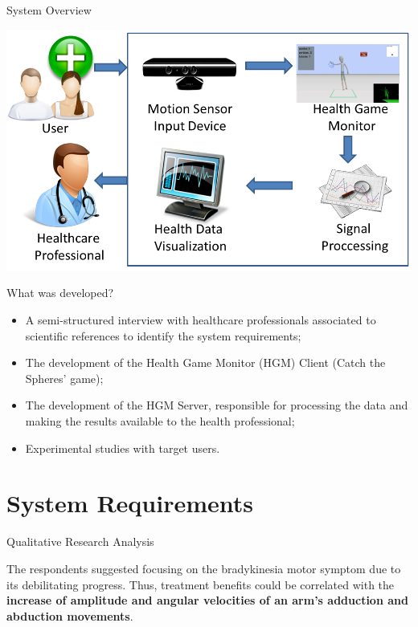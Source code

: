 \documentclass{beamer}
\begin{document}
\begin{frame}{System Overview}
		 \begin{block}{}
			\begin{center}
				\includegraphics[height=2.2 in]{img/systemoverview3.png}
			\end{center}
		 \end{block}
\end{frame}


\begin{frame}{What was developed?}
    \begin{block}{}
        \begin{itemize}[<+->]
            \item  A semi-structured interview with healthcare professionals associated to scientific references to identify the system requirements;
            \item The development of the Health Game Monitor (HGM) Client (Catch the Spheres' game);
            \item The development of the HGM Server, responsible for processing the data and making the results available to the health professional;
						\item Experimental studies with target users.
        \end{itemize}
    \end{block}
\end{frame}

\section{System Requirements}


\begin{frame}{Qualitative Research Analysis} 
    \begin{block}{}					
		The respondents suggested focusing on the bradykinesia motor symptom due to its debilitating progress. Thus, treatment benefits could be correlated with the \textbf{increase of amplitude and angular velocities of an arm's adduction and abduction movements}.
    \end{block}
\end{frame} 
\end{document}
